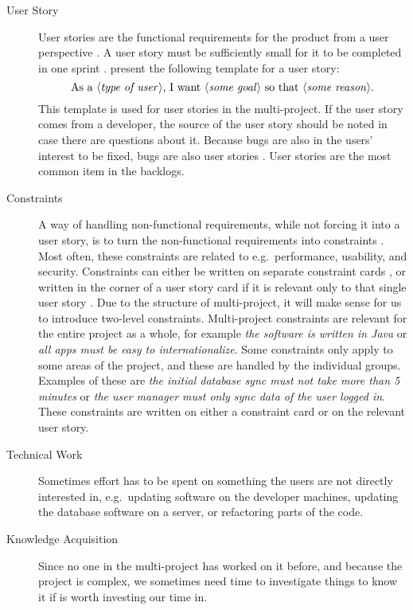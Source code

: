 \begin{description}
  \item[User Story] User stories are the functional requirements for the product from a user perspective \parencite{larman2003}. A user story must be sufficiently small for it to be completed in one sprint \parencite{cohn2009}. \cite{cohn2009} present the following template for a user story: 
  $$\text{As a $\langle{}$\emph{type of user}$\rangle{}$, I want $\langle{}$\emph{some goal}$\rangle{}$ so that $\langle{}$\emph{some reason}$\rangle{}$}.$$
This template is used for user stories in the multi-project. If the user story comes from a developer, the source of the user story should be noted in case there are questions about it. Because bugs are also in the users' interest to be fixed, bugs are also user stories \parencite{product-backlog2015}. User stories are the most common item in the backlogs.

  \item[Constraints] A way of handling non-functional requirements, while not forcing it into a user story, is to turn the non-functional requirements into constraints \parencite[ch.16]{cohn2004}. Most often, these constraints are related to e.g.\ performance, usability, and security. Constraints can either be written on separate constraint cards \parencite[ch.16]{cohn2004}, or written in the corner of a user story card if it is relevant only to that single user story \parencite[ch.7]{cohn2004}. Due to the structure of multi-project, it will make sense for us to introduce two-level constraints. Multi-project constraints are relevant for the entire project as a whole, for example \emph{the software is written in Java} or \emph{all apps must be easy to internationalize}. Some constraints only apply to some areas of the project, and these are handled by the individual groups. Examples of these are \emph{the initial database sync must not take more than 5 minutes} or \emph{the user manager must only sync data of the user logged in}. These constraints are written on either a constraint card or on the relevant user story.
  \item[Technical Work] Sometimes effort has to be spent on something the users are not directly interested in, e.g.\ updating software on the developer machines, updating the database software on a server, or refactoring parts of the code.
  \item[Knowledge Acquisition] Since no one in the multi-project has worked on it before, and because the project is complex, we sometimes need time to investigate things to know it if is worth investing our time in. 
\end{description}


